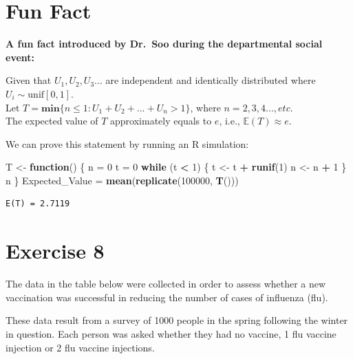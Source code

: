 \documentclass[
]{book}
\newenvironment{Shaded}{\begin{snugshade}}{\end{snugshade}}
\newcommand{\ControlFlowTok}[1]{\textcolor[rgb]{0.13,0.29,0.53}{\textbf{#1}}}
\newcommand{\DecValTok}[1]{\textcolor[rgb]{0.00,0.00,0.81}{#1}}
\newcommand{\FunctionTok}[1]{\textcolor[rgb]{0.13,0.29,0.53}{\textbf{#1}}}
\newcommand{\NormalTok}[1]{#1}
\newcommand{\OtherTok}[1]{\textcolor[rgb]{0.56,0.35,0.01}{#1}}
\newcommand{\SpecialCharTok}[1]{\textcolor[rgb]{0.81,0.36,0.00}{\textbf{#1}}}
\begin{document}
\chapter{Fun Fact}\label{fun-fact}

\textbf{A fun fact introduced by Dr.~Soo during the departmental social event:}

Given that \(U_1, U_2, U_3...\) are independent and identically distributed where \(U_i \sim \text{unif}[0,1]\).\\
Let \(T = \textbf{min}\{n \leq 1: U_1 + U_2 + ... + U_n > 1\}\), where \(n = 2, 3, 4..., etc\).\\
The expected value of \(T\) approximately equals to \(e\), i.e., \(\mathbb{E}(T) \approx e\).

We can prove this statement by running an R simulation:

\begin{Shaded}
\begin{Highlighting}[]
\NormalTok{T }\OtherTok{\textless{}{-}} \ControlFlowTok{function}\NormalTok{() \{}
\NormalTok{  n }\OtherTok{=} \DecValTok{0}
\NormalTok{  t }\OtherTok{=} \DecValTok{0}
  \ControlFlowTok{while}\NormalTok{ (t }\SpecialCharTok{\textless{}} \DecValTok{1}\NormalTok{) \{}
\NormalTok{    t }\OtherTok{\textless{}{-}}\NormalTok{ t }\SpecialCharTok{+} \FunctionTok{runif}\NormalTok{(}\DecValTok{1}\NormalTok{)}
\NormalTok{    n }\OtherTok{\textless{}{-}}\NormalTok{ n }\SpecialCharTok{+} \DecValTok{1}
\NormalTok{  \}}
\NormalTok{  n}
\NormalTok{\}}
\NormalTok{Expected\_Value }\OtherTok{=} \FunctionTok{mean}\NormalTok{(}\FunctionTok{replicate}\NormalTok{(}\DecValTok{100000}\NormalTok{, }\FunctionTok{T}\NormalTok{()))}
\end{Highlighting}
\end{Shaded}

\begin{verbatim}
E(T) = 2.7119
\end{verbatim}

\chapter{Exercise 8}\label{exercise-8}

The data in the table below were collected in order to assess whether a new vaccination was
successful in reducing the number of cases of influenza (flu).

These data result from a survey of 1000 people in the spring following the winter in question. Each
person was asked whether they had no vaccine, 1 flu vaccine injection or 2 flu vaccine injections.
\end{document}
